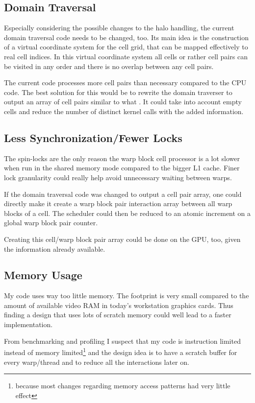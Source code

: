 \subsection{Domain Traversal}
Especially considering the possible changes to the halo handling, the current domain traversal code needs to be changed, too. Its main idea is the construction of a virtual coordinate system for the cell grid, that can be mapped effectively to real cell indices. In this virtual coordinate system all cells or rather cell pairs can be visited in any order and there is no overlap between any cell pairs.

The current code processes more cell pairs than necessary compared to the CPU code. The best solution for this would be to rewrite the domain traverser to output an array of cell pairs similar to what \cite{orend10numerische}. It could take into account empty cells and reduce the number of distinct kernel calls with the added information.

\subsection{Less Synchronization/Fewer Locks}
The spin-locks are the only reason the warp block cell processor is a lot slower when run in the shared memory mode compared to the bigger L1 cache. Finer lock granularity could really help avoid unnecessary waiting between warps.

If the domain traversal code was changed to output a cell pair array, one could directly make it create a warp block pair interaction array between all warp blocks of a cell. The scheduler could then be reduced to an atomic increment on a global warp block pair counter.

Creating this cell/warp block pair array could be done on the GPU, too, given the information already available.

\subsection{Memory Usage}
My code uses way too little memory. The footprint is very small compared to the amount of available video RAM in today's workstation graphics cards. Thus finding a design that uses lots of scratch memory could well lead to a faster implementation.

From benchmarking and profiling I suspect that my code is instruction limited instead of memory limited\footnote{because most changes regarding memory access patterns had very little effect} and the design idea is to have a scratch buffer for every warp/thread and to reduce all the interactions later on.

